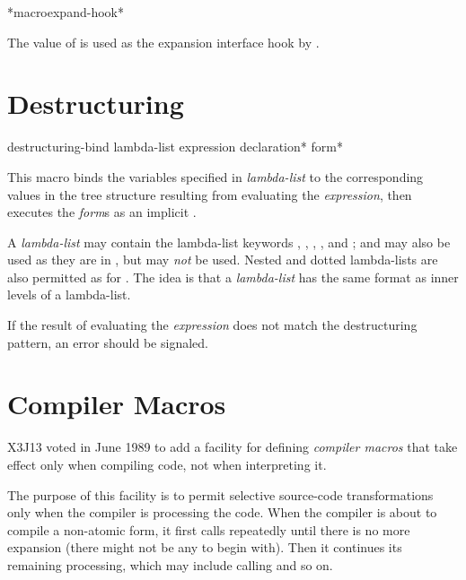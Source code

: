 \begin{defun}[Variable]
*macroexpand-hook*

The value of  is used as the expansion
interface hook by .
\end{defun}

\section{Destructuring}

\begin{defmac}
destructuring-bind lambda-list expression {declaration}* {form}*

   This macro binds the variables specified in \emph{lambda-list} to the corresponding
   values in the tree structure resulting from evaluating the \emph{expression},
   then executes the \emph{form\/}s as an implicit .

A  \emph{lambda-list} may contain
the lambda-list keywords , , ,
, and ;  and 
may also be used as they are in , but  may
\emph{not} be used.  Nested and dotted lambda-lists are also permitted
as for .
The idea is that a  \emph{lambda-list}
has the same format as inner levels of a  lambda-list.

   If the result of evaluating the \emph{expression} does not match the 
   destructuring pattern, an error should be signaled.
\end{defmac}

\section{Compiler Macros}

X3J13 voted in June 1989 
to add a facility for defining \emph{compiler macros} that
take effect only when compiling code, not when interpreting it.

The purpose of this facility is to permit selective source-code
transformations only when the compiler is processing the code.
When the compiler is about to compile a non-atomic form, it first calls
 repeatedly until there is no more expansion
(there might not be any to begin with).  Then it continues its
remaining processing, which may include calling  and so on.

